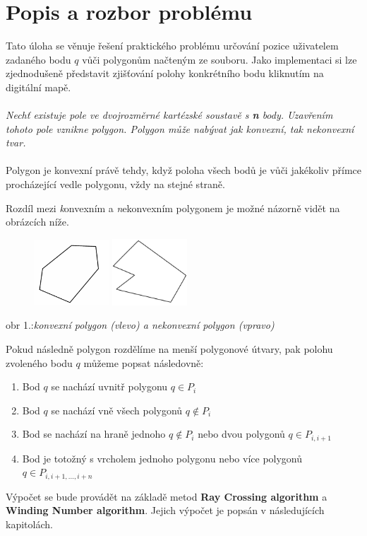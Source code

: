 \documentclass{article}
\begin{document}
\section{Popis a rozbor problému} %
\indent 
Tato úloha se věnuje řešení praktického problému určování pozice uživatelem zadaného bodu $q$ vůči polygonům načteným ze souboru. Jako implementaci si lze zjednodušeně představit zjišťování polohy konkrétního bodu kliknutím na digitální mapě. 
\\
\\
\textsl{Nechť existuje pole ve dvojrozměrné kartézské soustavě s \textbf n body. Uzavřením tohoto pole vznikne polygon. Polygon může nabývat jak konvexní, tak nekonvexní tvar.}
\\
\\
Polygon je konvexní právě tehdy, když poloha všech bodů je vůči jakékoliv přímce procházející vedle polygonu, vždy na stejné straně. 

Rozdíl mezi \textsl konvexním a  \textsl nekonvexním polygonem je možné názorně vidět na obrázcích níže.
\begin{figure}[htbp]
\centering
        \includegraphics[clip, trim=0cm 0cm 0cm 0cm, width=0.2500\textwidth]{obrazek1.png}
 \includegraphics[clip, trim=0cm 0cm 0cm 0cm, width=0.2500\textwidth]{obrazek2.png}
\end{figure}
\bigskip
\begin{center}
obr 1.:\textsl{konvexní polygon (vlevo) a nekonvexní polygon (vpravo)}
\end{center}
Pokud následně polygon rozdělíme na menší polygonové útvary, pak polohu zvoleného bodu $q$ můžeme popsat následovně: 
\begin{enumerate}
\item   Bod $q$ se nachází uvnitř polygonu  $q {\in} P_i$ 
\item   Bod $q$ se nachází vně všech polygonů  $q {\not \in} P_i$ 
\item   Bod se nachází na hraně jednoho  $q {\not \in} P_i$ nebo dvou polygonů $q {\in} P_{i,i+1}$ 
\item   Bod je totožný s vrcholem jednoho polygonu nebo více polygonů $q {\in} P_{i,i+1,...,i+n}$
\end{enumerate}
Výpočet se bude provádět na základě metod \textbf {Ray Crossing algorithm} a  \textbf {Winding Number algorithm}. Jejich výpočet je popsán v následujících kapitolách. 
\\
\clearpage
\end{document}
